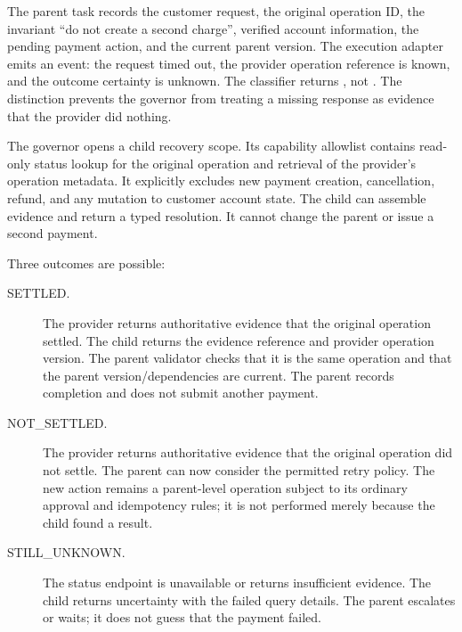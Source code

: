 The parent task records the customer request, the original operation ID, the invariant ``do not create a second charge'', verified account information, the pending payment action, and the current parent version. The execution adapter emits an  event: the request timed out, the provider operation reference is known, and the outcome certainty is unknown. The classifier returns , not . The distinction prevents the governor from treating a missing response as evidence that the provider did nothing.

The governor opens a child recovery scope. Its capability allowlist contains read-only status lookup for the original operation and retrieval of the provider's operation metadata. It explicitly excludes new payment creation, cancellation, refund, and any mutation to customer account state. The child can assemble evidence and return a typed resolution. It cannot change the parent or issue a second payment.

Three outcomes are possible:

\begin{description}
  \item[SETTLED.] The provider returns authoritative evidence that the original operation settled. The child returns the evidence reference and provider operation version. The parent validator checks that it is the same operation and that the parent version/dependencies are current. The parent records completion and does not submit another payment.
  \item[NOT\_SETTLED.] The provider returns authoritative evidence that the original operation did not settle. The parent can now consider the permitted retry policy. The new action remains a parent-level operation subject to its ordinary approval and idempotency rules; it is not performed merely because the child found a result.
  \item[STILL\_UNKNOWN.] The status endpoint is unavailable or returns insufficient evidence. The child returns uncertainty with the failed query details. The parent escalates or waits; it does not guess that the payment failed.
\end{description}


